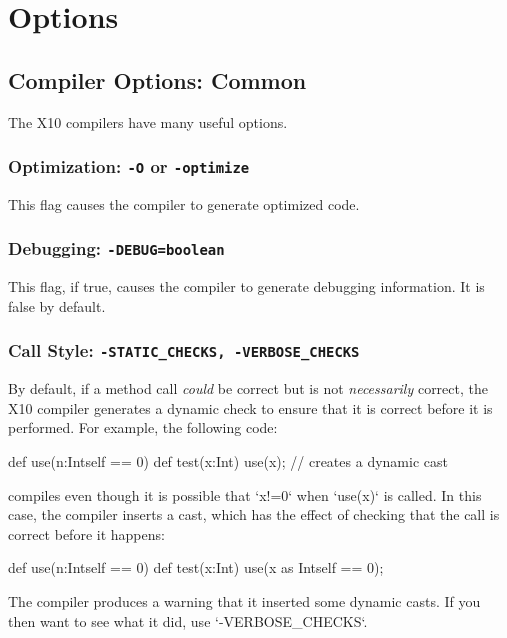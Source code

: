 \chapter{Options}

\section{Compiler Options: Common}

The X10 compilers have many useful options. 


\subsection{Optimization: {\tt -O} or {\tt -optimize}}

This flag causes the compiler to generate optimized code.


\subsection{Debugging: {\tt -DEBUG=boolean}}

This flag, if true, causes the compiler to generate debugging information.  It
is false by default.

\subsection{Call Style: {\tt -STATIC\_CHECKS, -VERBOSE\_CHECKS}}
\label{sect:Callstyle}

By default, if a method call {\em could} be correct but is not {\em
necessarily} correct, the X10 compiler generates a dynamic check to ensure
that it is correct before it is performed.  For example, the following code: 
\begin{xten}
def use(n:Int{self == 0}) {}
def test(x:Int) { 
   use(x); // creates a dynamic cast
}
\end{xten}
compiles even though it is possible that 
\xcd`x!=0` when \xcd`use(x)` is called.  In this case, the compiler inserts a
cast, which has the effect of checking that the call is correct before it
happens: 
\begin{xten}
def use(n:Int{self == 0}) {}
def test(x:Int) { 
   use(x as Int{self == 0}); 
}
\end{xten}
The compiler produces a warning that it inserted some dynamic casts.
If you then want to see what it did, use \xcd`-VERBOSE_CHECKS`.

